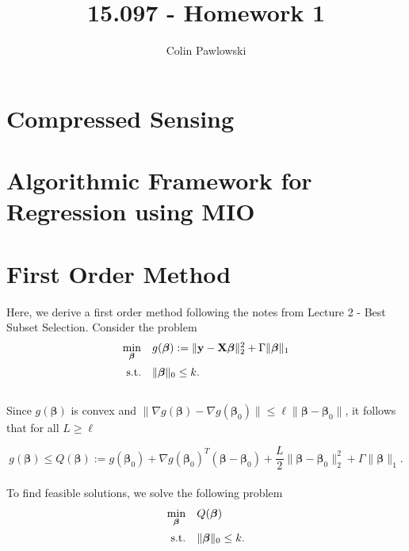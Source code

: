\documentclass[12pt]{article}
\newcommand{\M}{\mathbf}
\newcommand{\MS}{\boldsymbol}
\newcommand{\1}{\mathds{1}}
\begin{document}
\title{15.097 - Homework 1}
 
\author{Colin Pawlowski}
\maketitle

\section{Compressed Sensing}

\section{Algorithmic Framework for Regression using MIO}

\section{First Order Method}

Here, we derive a first order method following the notes from Lecture 2 - Best Subset Selection.  Consider the problem
\begin{equation}
\begin{array}{rll}
  \min \limits_{\MS \beta} & g(\MS \beta) := \|\M y - \M X \MS \beta \|_2^2 + \Gamma \| \MS \beta \|_1 \vspace{5pt}\\
  \text{s.t.} & \| \MS \beta \|_0 \le k.
\end{array}
\end{equation}\\

Since $g(\MS \beta)$ is convex and $\|\nabla g(\MS \beta) - \nabla g(\MS \beta_0)\| \le \ell \| \MS \beta - \MS \beta_0\|$, it follows that for all $L \ge \ell$

\begin{equation}
g(\MS \beta) \le Q(\MS \beta) := g(\MS \beta_0) + \nabla g(\MS \beta_0)^T(\MS \beta - \MS \beta_0) + \frac{L}{2} \|\MS \beta - \MS \beta_0\|_2^2 + \Gamma \| \MS \beta \|_1.
\end{equation}\\

To find feasible solutions, we solve the following problem
\begin{equation}
\begin{array}{rll}
  \min \limits_{\MS \beta} & Q(\MS \beta) \vspace{5pt}\\
  \text{s.t.} & \| \MS \beta \|_0 \le k.
\end{array}
\end{equation}\\
\end{document}

